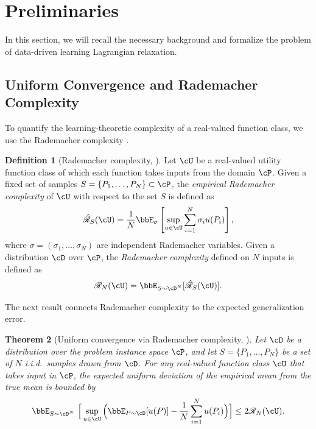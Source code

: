 \documentclass{article}
\theoremstyle{plain}
\newtheorem{theorem}{Theorem}[section]
\theoremstyle{definition}
\newtheorem{definition}[theorem]{Definition}
\theoremstyle{remark}
\begin{document}
\section{Preliminaries} \label{sec:preliminaries}
In this section, we will recall the necessary background and formalize the problem of data-driven learning Lagrangian relaxation. 

\subsection{Uniform Convergence and Rademacher Complexity}

To quantify the learning-theoretic complexity of a real-valued function class, we use the Rademacher complexity \citep{bartlett2002rademacher}.
\begin{definition}[Rademacher complexity, \citet{bartlett2002rademacher}]
    Let $\cU$ be a real-valued utility function class of which each function takes inputs from the domain $\cP$. Given a fixed set of samples $S = \{P_1, \dots, P_N\} \subset \cP$, the \textit{empirical Rademacher complexity} of $\cU$ with respect to the set $S$ is defined as
    \[
        \hat{\mathscr{R}}_S(\cU) = \frac{1}{N} \bbE_{\sigma}\left[\sup_{u \in \cU}  \sum_{i = 1}^N \sigma_i u(P_i)\right],
    \]
    where $\sigma = (\sigma_1, \dots, \sigma_N)$ are independent Rademacher variables. Given a distribution $\cD$ over $\cP$, the \textit{Rademacher complexity} defined on $N$ inputs is defined as 
    \[
        \mathscr{R}_N(\cU) = \bbE_{S \sim \cD^N}[\hat{\mathscr{R}}_S(\cU)].
    \]
\end{definition}
The next result connects Rademacher complexity to the expected generalization error. 

\begin{theorem}[Uniform convergence via Rademacher complexity, \citet{bartlett2002rademacher}] \label{thm:generalization-guarantee-via-rademacher}
    Let $\cD$ be a distribution over the problem instance space $\cP$, and let $S = \{P_1, \dots, P_N\}$ be a set of $N$ i.i.d.~samples drawn from $\cD$. For any real-valued function class $\cU$ that takes input in $\cP$, the expected uniform deviation of the empirical mean from the true mean is bounded by
    \[
        \bbE_{S \sim \cD^N}~\Big[\sup_{u \in \cU}\Big(\bbE_{P \sim \cD}[u(P)] - \frac{1}{N}\sum_{i = 1}^N u(P_i)\Big)\Big] \leq 2\mathscr{R}_N(\cU).
    \]
\end{theorem}
\end{document}

